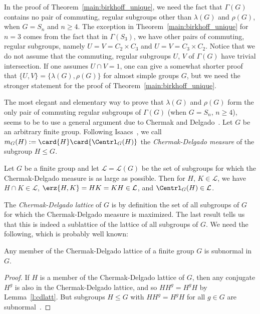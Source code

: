 In the proof of Theorem~\ref{main:birkhoff_unique}, 
we need the fact
that $\Gamma(G)$ contains no pair of commuting,
regular subgroups other than $\lambda(G)$
and $\rho(G)$, when $G = S_n$ and $n\geq 4$.
The exception in Theorem~\ref{main:birkhoff_unique}
for $n=3$
comes from the fact that 
in $\Gamma(S_3)$, we have other pairs of commuting, regular
subgroups, namely $U=V = C_2 \times C_3$
and $U=V= C_3\times C_2$.
Notice that we do not assume that the commuting, regular subgroups
$U$, $V$
of $\Gamma(G)$ have trivial intersection.
If one assumes $U\cap V=1$, one can give a somewhat 
shorter proof that 
$\{U,V\} = \{ \lambda(G), \rho(G)\}$
for almost simple groups $G$,
but we need the stronger statement for the proof of 
Theorem~\ref{main:birkhoff_unique}.

The most elegant and elementary way to prove 
that $\lambda(G)$ and $\rho(G)$ form the only pair
of commuting regular subgroups of $\Gamma(G)$
(when $G= S_n$, $n\geq 4$),
seems to be to use a general argument due to
Chermak and Delgado~\cite{ChermakDelgado89}.
Let $G$ be an arbitrary finite group.
Following Isaacs~\cite[\S~1G]{IsaacsFGT},
we call $m_G(H) := \card{H}\card{\Centrl_G(H)}$
the \emph{Chermak-Delgado measure} of the subgroup
$H\leq G$.

\begin{lemma}\cite[Theorem~1.44]{IsaacsFGT}
  \label{l:cdlatt}
  Let $G$ be a finite  group and let
  $\mathcal{L} = \mathcal{L}(G)$ be the set of subgroups
  for which the Chermak-Delgado measure is as large as 
  possible.
  Then for $H$, $K\in \mathcal{L}$, we have
  $H\cap K\in \mathcal{L}$,
  $\erz{H,K} =HK=KH \in \mathcal{L}$, 
  and $\Centrl_G(H)\in \mathcal{L}$.
\end{lemma}

The \emph{Chermak-Delgado lattice} of $G$ is by definition
the set of all subgroups of $G$ for which 
the Chermak-Delgado measure is maximized.
The last result tells us that this is indeed a sublattice
of the lattice of all subgroups of $G$.
We need the following, which is probably well known:

\begin{cor}
  Any member of the Chermak-Delgado lattice
  of a finite group $G$ is subnormal in $G$.
\end{cor}

\begin{proof}
If $H$ is a member of the Chermak-Delgado lattice of $G$,
then any conjugate $H^g$ is also in the 
Chermak-Delgado lattice,
and so $HH^g = H^g H$ by Lemma~\ref{l:cdlatt}.
But subgroups $H\leq G$ with $HH^g = H^gH$ for all $g\in G$
are subnormal~\cite[Theorem~2.8]{IsaacsFGT}.
\end{proof}

